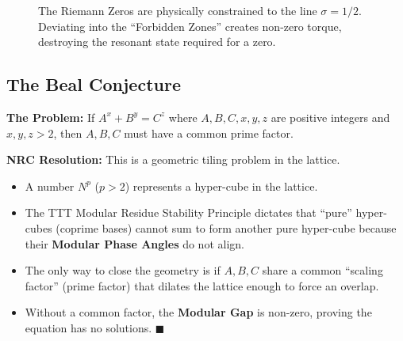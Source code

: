 \documentclass[11pt,a4paper,oneside]{article}
\begin{document}
	\begin{figure}[h]
		\centering
		\caption{The Riemann Zeros are physically constrained to the line \(\sigma=1/2\). Deviating into the ``Forbidden Zones'' creates non-zero torque, destroying the resonant state required for a zero.}
	\end{figure}

	\subsection{The Beal Conjecture}
	\textbf{The Problem:} If \(A^x + B^y = C^z\) where \(A,B,C,x,y,z\) are positive integers and \(x,y,z > 2\), then \(A,B,C\) must have a common prime factor.

	\textbf{NRC Resolution:}
	This is a geometric tiling problem in the lattice.
	\begin{itemize}
		\item A number \(N^p\) (\(p>2\)) represents a hyper-cube in the lattice.
		\item The TTT Modular Residue Stability Principle dictates that ``pure'' hyper-cubes (coprime bases) cannot sum to form another pure hyper-cube because their \textbf{Modular Phase Angles} do not align.
		\item The only way to close the geometry is if \(A, B, C\) share a common ``scaling factor'' (prime factor) that dilates the lattice enough to force an overlap.
		\item Without a common factor, the \textbf{Modular Gap} is non-zero, proving the equation has no solutions. \hfill \(\blacksquare\)
	\end{itemize}
\end{document}
